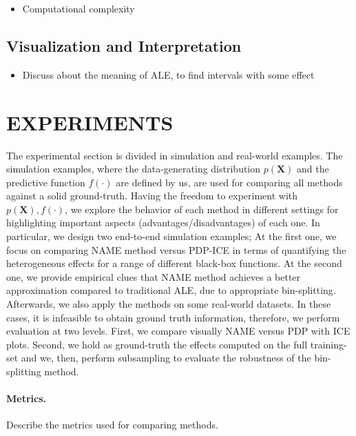 \documentclass[twoside]{article}
\begin{document}
\noindent

\begin{itemize}
\item Computational complexity
\end{itemize}

\subsection{Visualization and Interpretation}
\label{sec:visualization}

\begin{itemize}
\item Discuss about the meaning of ALE, to find intervals with some effect
\end{itemize}

\clearpage
\section{EXPERIMENTS}

The experimental section is divided in simulation and real-world
examples. The simulation examples, where the data-generating
distribution \(p(\mathbf{X})\) and the predictive function
\(f(\cdot)\) are defined by us, are used for comparing all methods
against a solid ground-truth. Having the freedom to experiment with
\(p(\mathbf{X}), f(\cdot)\), we explore the behavior of each method in
different settings for highlighting important aspects
(advantages/disadvantages) of each one. In particular, we design two
end-to-end simulation examples; At the first one, we focus on
comparing NAME method versus PDP-ICE in terms of quantifying the
heterogeneous effects for a range of different black-box functions. At
the second one, we provide empirical clues that NAME method achieves a
better approximation compared to traditional ALE, due to appropriate
bin-splitting. Afterwards, we also apply the methods on some
real-world datasets. In these cases, it is infeasible to obtain ground
truth information, therefore, we perform evaluation at two
levels. First, we compare visually NAME versus PDP with ICE
plots. Second, we hold as ground-truth the effects computed on the
full training-set and we, then, perform subsampling to evaluate the
robustness of the bin-splitting method.

\paragraph{Metrics.} Describe the metrics used for comparing methods.
\end{document}
